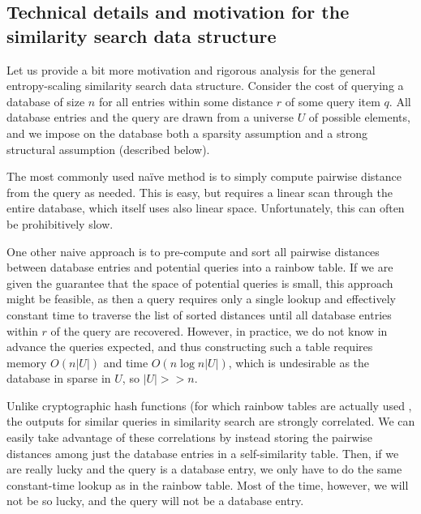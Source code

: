 \documentclass[review,preprint,12pt]{elsarticle}
\theoremstyle{definition}
\theoremstyle{remark}
\numberwithin{equation}{section}
\begin{document}
\subsection{Technical details and motivation for the similarity search data structure}
Let us provide a bit more motivation and rigorous analysis for the general entropy-scaling similarity search data structure.
Consider the cost of querying a database of size $n$ for all entries within some distance $r$ of some query item $q$.
All database entries and the query are drawn from a universe $U$ of possible elements, and we impose on the database both a sparsity assumption and a strong structural assumption (described below).

The most commonly used na\"ive method is to simply compute pairwise distance from the query as needed.
This is easy, but requires a linear scan through the entire database, which itself uses also linear space.
Unfortunately, this can often be prohibitively slow.

One other naive approach is to pre-compute and sort all pairwise distances between database entries and potential queries into a rainbow table.
If we are given the guarantee that the space of potential queries is small, this approach might be feasible, as then a query requires only a single lookup and effectively constant time to traverse the list of sorted distances until all database entries within $r$ of the query are recovered.
However, in practice, we do not know in advance the queries expected, and thus constructing such a table requires memory $O(n|U|)$ and time $O(n \log n |U|)$, which is undesirable as the database in sparse in $U$, so $|U| >>n$.

Unlike cryptographic hash functions (for which rainbow tables are actually used \cite{oechslin2003making}, the outputs for similar queries in similarity search are strongly correlated.
We can easily take advantage of these correlations by instead storing the pairwise distances among just the database entries in a self-similarity table.
Then, if we are really lucky and the query is a database entry, we only have to do the same constant-time lookup as in the rainbow table.
Most of the time, however, we will not be so lucky, and the query will not be a database entry.
\end{document}
